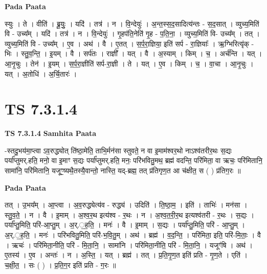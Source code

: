 \documentclass[17pt]{extarticle}
\begin{document}
\textbf{Pada Paata} \newline

स्युः । ते । वीति॑ । ब्रू॒युः॒ । यदि॑ । तत्र॑ । न । वि॒न्देयुः॑ । अ॒न्त॒स्स॒द॒सादित्य॑न्तः - स॒द॒सात् । व्युच्य॒मिति॑ वि - उच्य᳚म् । यदि॑ । तत्र॑ । न । वि॒न्देयुः॑ । गृ॒हप॑ति॒नेति॑ गृ॒ह - प॒ति॒ना॒ । व्युच्य॒मिति॑ वि- उच्य᳚म् । तत् । व्युच्य॒मिति॑ वि - उच्य᳚म् । ए॒व । अथ॑ । वै । ए॒तत् । स॒र्प॒रा॒ज्ञिया॒ इति॑ सर्प - रा॒ज्ञियाः᳚ । ऋ॒ग्भिरित्यृ॑क् - भिः । स्तु॒व॒न्ति॒ । इ॒यम् । वै । सर्प॑तः । राज्ञी᳚ । यत् । वै । अ॒स्याम् । किम् । च॒ । अर्च॑न्ति । यत् । आ॒नृ॒चुः । तेन॑ । इ॒यम् । स॒र्प॒रा॒ज्ञीति॑ सर्प-रा॒ज्ञी । ते । यत् । ए॒व । किम् । च॒ । वा॒चा । आ॒नृ॒चुः । यत् । अ॒तोधि॑ । अ॒र्चि॒तारः॑ ।  \newline




\section*{ TS 7.3.1.4 }

\textbf{TS 7.3.1.4 } \newline
\textbf{Samhita Paata} \newline

-स्तदु॒भय॑मा॒प्त्वा ऽव॒रुद्ध्योत् ति॑ष्ठा॒मेति॒ ताभि॒र्मन॑सा स्तुवते॒ न वा इ॒माम॑श्वर॒थो नाऽश्व॑तरीर॒थः स॒द्यः पर्या᳚प्तुमर्.हति॒ मनो॒ वा इ॒माꣳ स॒द्यः पर्या᳚प्तुमर्.हति॒ मनः॒ परि॑भवितु॒मथ॒ ब्रह्म॑ वदन्ति॒ परि॑मिता॒ वा ऋचः॒ परि॑मितानि॒ सामा॑नि॒ परि॑मितानि॒ यजूꣳ॒॒ष्यथै॒तस्यै॒वान्तो॒ नास्ति॒ यद्-ब्रह्म॒ तत् प्र॑तिगृण॒त आ च॑क्षीत॒ स ( ) प्र॑तिग॒रः ॥ \newline

\textbf{Pada Paata} \newline

तत् । उ॒भय᳚म् । आ॒प्त्वा । अ॒व॒रुद्ध्येत्य॑व - रुद्ध्य॑ । उदिति॑ । ति॒ष्ठा॒म॒ । इति॑ । ताभिः॑ । मन॑सा । स्तु॒व॒ते॒ । न । वै । इ॒माम् । अ॒श्व॒र॒थ इत्य॑श्व - र॒थः । न । अ॒श्व॒त॒री॒र॒थ इत्यश्व॑तरी - र॒थः । स॒द्यः । पर्या᳚प्तु॒मिति॒ परि॑-आ॒प्तु॒म् । अ॒र्.॒ह॒ति॒ । मनः॑ । वै । इ॒माम् । स॒द्यः । पर्या᳚प्तु॒मिति॒ परि॑ - आ॒प्तु॒म् । अ॒र्.॒ह॒ति॒ । मनः॑ । परि॑भवितु॒मिति॒ परि॑-भ॒वि॒तु॒म् । अथ॑ । ब्रह्म॑ । व॒द॒न्ति॒ । परि॑मिता॒ इति॒ परि॑-मि॒ताः॒ । वै । ऋचः॑ । परि॑मिता॒नीति॒ परि॑ - मि॒ता॒नि॒ । सामा॑नि । परि॑मिता॒नीति॒ परि॑ - मि॒ता॒नि॒ । यजूꣳ॑षि । अथ॑ । ए॒तस्य॑ । ए॒व । अन्तः॑ । न । अ॒स्ति॒ । यत् । ब्रह्म॑ । तत् । प्र॒ति॒गृ॒ण॒त इति॑ प्रति - गृ॒ण॒ते । एति॑ । च॒क्षी॒त॒ । सः ( ) । प्र॒ति॒ग॒र इति॑ प्रति - ग॒रः ॥  \newline
\end{document}
